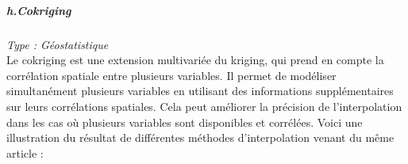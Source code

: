 \subparagraph{h.Cokriging \cite{kringing}}
\textit{Type : Géostatistique} \\
\phantom{----}Le cokriging est une extension multivariée du kriging, qui prend en compte la corrélation spatiale entre plusieurs variables. Il permet de modéliser simultanément plusieurs variables en utilisant des informations supplémentaires sur leurs corrélations spatiales. Cela peut améliorer la précision de l'interpolation dans les cas où plusieurs variables sont disponibles et corrélées.
Voici une illustration du résultat de différentes méthodes d'interpolation venant du même article :

